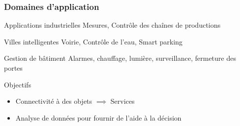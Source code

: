 \begin{frame}\frametitle{Domaines d'application}

    \begin{block}{Applications industrielles}
      Mesures, Contrôle des chaînes de productions
    \end{block}

    \begin{block}{Villes intelligentes}
      Voirie, Contrôle de l'eau, Smart parking
    \end{block}

    \begin{block}{Gestion de bâtiment}
      Alarmes, chauffage, lumière, surveillance, fermeture des portes
    \end{block}

  \begin{alertblock}{Objectifs}
    \begin{itemize}
      \item Connectivité à des objets $\implies$ Services
      \item Analyse de données pour fournir de l'aide à la décision
    \end{itemize}
  \end{alertblock}




\end{frame}

